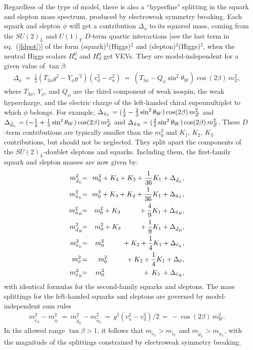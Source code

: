 \documentclass[11pt]{article}
\def\beq{\begin{eqnarray}}
\def\eeq{\end{eqnarray}}
\begin{document}
Regardless of the type of model,
there is also a ``hyperfine" splitting in the squark and slepton mass 
spectrum, produced by electroweak symmetry breaking. Each squark and 
slepton $\phi$ will get a contribution $\Delta_\phi$ to its squared mass, 
coming from the $SU(2)_L$ and $U(1)_Y$ $D$-term quartic interactions [see 
the last term in eq.~(\ref{fdpot})] of the form (squark)$^2$(Higgs)$^2$ 
and (slepton)$^2$(Higgs)$^2$, when the neutral Higgs scalars $H_u^0$ and 
$H_d^0$ get VEVs. They are model-independent for a given value of 
$\tan\beta$:
\beq
\Delta_\phi \>=\> \frac{1}{2}
(T_{3\phi} g^2 - Y_\phi g^{\prime 2}) (v_d^2 - v_u^2) \>=\> 
(T_{3\phi} - Q_\phi\sin^2\theta_W)
\cos (2\beta)\, m_Z^2 ,
\label{defDeltaphi}
\eeq
where $T_{3\phi}$, $Y_\phi$, and $Q_\phi$ are the third component of weak 
isospin, the weak hypercharge, and the electric charge of the left-handed 
chiral supermultiplet to which $\phi$ belongs. For example, 
$\Delta_{\tilde u_L} = ({1\over 2} - {2\over 3} \sin^2\theta_W)\cos 
(2\beta)\, m_Z^2$ and $\Delta_{\tilde d_L} = (-{1\over 2} + {1\over 3} 
\sin^2\theta_W)\cos (2\beta)\, m_Z^2$ and $\Delta_{\tilde u_R} = ({2\over 
3} \sin^2\theta_W)\cos (2\beta) \, m_Z^2$. These $D$-term contributions 
are typically smaller than the $m_0^2$ and $K_1$, $K_2$, $K_3$ 
contributions, but should not be neglected. They split apart the 
components of the $SU(2)_L$-doublet sleptons and squarks. Including them, 
the first-family squark and slepton masses are now given by:
\beq
m_{\tilde d_L}^2 \!\!&=&\!\! m_0^2 + K_3 + K_2 + {1\over 36} K_1 +
\Delta_{\tilde d_L},
\label{msdlform}
\\
m_{\tilde u_L}^2 \!\!&=&\!\! m_0^2 + K_3 + K_2 + {1\over 36} K_1 +
\Delta_{\tilde u_L},
\\
m_{\tilde u_R}^2\!\! &=&\!\! m_0^2 + K_3 \qquad\>\>\>  + {4\over 9} K_1 +
\Delta_{\tilde u_R},
\\
m_{\tilde d_R}^2 \!\!&=&\!\! m_0^2 + K_3 \qquad\>\>\>  + {1\over 9} K_1 +
\Delta_{\tilde d_R},
\label{msdrform}
\\
m_{\tilde e_L}^2 \!\!&=&\!\! m_0^2 \qquad\>\>\> + K_2 + {1\over 4} K_1 +
\Delta_{\tilde e_L},
\label{mselform}
\\
m_{\tilde \nu}^2 \!&=& \!\! m_0^2 \qquad\>\>\> + K_2 + {1\over 4} K_1 +
\Delta_{\tilde \nu},
\\
m_{\tilde e_R}^2 \!\!&=&\!\! m_0^2 \qquad\qquad\>\>\>\>\>\> \, +\,
K_1
\, + \Delta_{\tilde e_R},
\label{mserform}
\eeq
with identical formulas for the second-family squarks and sleptons. The 
mass splittings for the left-handed squarks and sleptons are governed by 
model-independent sum rules
\beq
m_{\tilde e_L}^2 -m_{\tilde \nu_e}^2 \,=\, 
m_{\tilde d_L}^2 -m_{\tilde u_L}^2 \,=\, 
g^2 (v_u^2 - v_d^2)/2 \,=\,  -\cos (2\beta)\, m_W^2  .
\eeq
In the allowed range $\tan\beta>1$, it follows that $m_{\tilde e_L} > 
m_{\tilde \nu_e}$ and $m_{\tilde d_L} > m_{\tilde u_L}$, with the 
magnitude of the splittings constrained by electroweak symmetry breaking.
\end{document}
